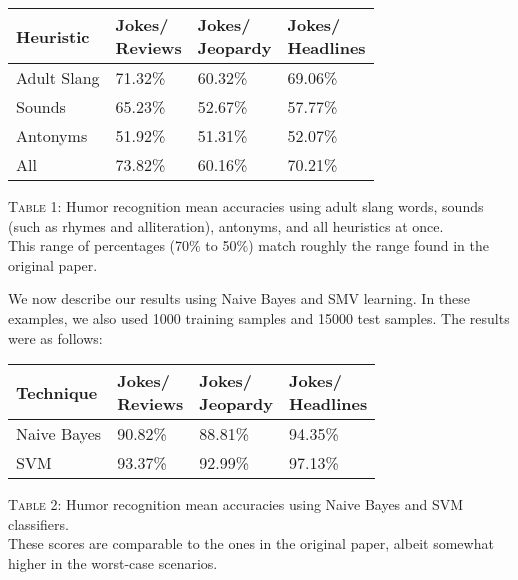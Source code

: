 \documentclass[11pt,a4paper]{article}
\begin{document}
\begin{center}
  \begin{tabular}{|p{1.5cm}|p{1.5cm}|p{1.5cm}|p{1.5cm}|}
    \hline
    Heuristic & \thead{Jokes/ \\ Reviews} & \thead{Jokes/ \\ Jeopardy} & \thead{Jokes/ \\ Headlines} \\
    \hline
    Adult Slang & 71.32\% & 60.32\% & 69.06\% \\
    \hline
    Sounds & 65.23\% & 52.67\% & 57.77\% \\
    \hline
    Antonyms & 51.92\% & 51.31\% & 52.07\% \\
    \hline
    All & 73.82\% & 60.16\% & 70.21\% \\
    \hline
\end{tabular}
\end{center}

\noindent \textsc{Table 1}: Humor recognition mean accuracies using adult slang words, sounds (such as rhymes and alliteration), antonyms, and all heuristics at once.\\

This range of percentages (70\% to 50\%) match roughly the range found in the original paper.

We now describe our results using Naive Bayes and SMV learning. In these examples, we also used 1000 training samples and 15000 test samples. The results were as follows:

\begin{center}
  \begin{tabular}{|p{1.5cm}|p{1.5cm}|p{1.5cm}|p{1.5cm}|}
    \hline
    Technique & \thead{Jokes/ \\ Reviews} & \thead{Jokes/ \\ Jeopardy} & \thead{Jokes/ \\ Headlines} \\
    \hline
    Naive Bayes & 90.82\% & 88.81\% & 94.35\% \\
    \hline
    SVM & 93.37\% & 92.99\% & 97.13\% \\
    \hline
\end{tabular}
\end{center}

\noindent \textsc{Table 2}: Humor recognition mean accuracies using Naive Bayes and SVM classifiers.\\

These scores are comparable to the ones in the original paper, albeit somewhat higher in the worst-case scenarios.
\end{document}
